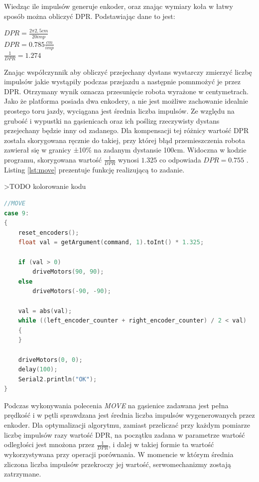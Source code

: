 Wiedząc ile impulsów generuje enkoder, oraz znając wymiary koła w łatwy sposób można obliczyć DPR. Podstawiając dane to jest:

\begin{center}
    $DPR = \frac{2 \pi 2,5cm}{20imp}$ \\[5pt]
    $DPR = 0.785 \frac{cm}{imp}$ \\[5pt]
    $\frac{1}{DPR} = 1.274$
\end{center}

Znając współczynnik aby obliczyć przejechany dystans wystarczy zmierzyć liczbę impulsów jakie wystąpiły podczas przejazdu a następnie pomnmożyć je przez DPR. Otrzymany wynik oznacza przesunięcie robota wyrażone w centymetrach. Jako że platforma posiada dwa enkodery, a nie jest możliwe zachowanie idealnie prostego toru jazdy, wyciągana jest średnia liczba impulsów. Ze względu na grubość i wypustki na gąsienicach oraz ich poślizg rzeczywisty dystans przejechany będzie inny od zadanego. Dla kompensacji tej różnicy wartość DPR została skorygowana ręcznie do takiej, przy której błąd przemieszczenia robota zawierał się w granicy ±10\% na zadanym dystansie 100cm. Widoczna w kodzie programu, skorygowana wartość $\frac{1}{DPR}$ wynosi $1.325$ co odpowiada $DPR=0.755$ . Listing \ref{lst:move} prezentuje funkcję realizującą to zadanie.

>TODO kolorowanie kodu
\begin{lstlisting}[basicstyle=\footnotesize\ttfamily,language=c++,caption=Fragment kodu obsługującego polecenie \emph{MOVE},label=lst:move]
//MOVE
case 9:
{
    reset_encoders();
    float val = getArgument(command, 1).toInt() * 1.325;

    if (val > 0)
        driveMotors(90, 90);
    else
        driveMotors(-90, -90);

    val = abs(val);
    while ((left_encoder_counter + right_encoder_counter) / 2 < val)
    {
    }

    driveMotors(0, 0);
    delay(100);
    Serial2.println("OK");
}
\end{lstlisting}

Podczas wykonywania polecenia \emph{MOVE} na gąsienice zadawana jest pełna prędkość i w pętli sprawdzana jest średnia liczba impulsów wygenerowanych przez enkoder. Dla optymalizacji algorytmu, zamiast przeliczać przy każdym pomiarze liczbę impulsów razy wartość DPR, na początku zadana w parametrze wartość odległości jest mnożona przez $\frac{1}{DPR}$, i dalej w takiej formie ta wartość wykorzystywana przy operacji porównania. W momencie w którym średnia zliczona liczba impulsów przekroczy jej wartość, serwomechanizmy zostają zatrzymane.
\\ 

